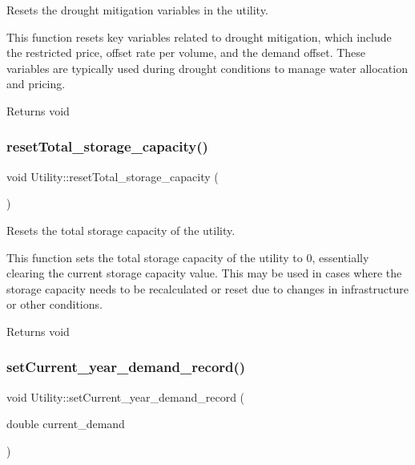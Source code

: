 Resets the drought mitigation variables in the utility. 

This function resets key variables related to drought mitigation, which include the restricted price, offset rate per volume, and the demand offset. These variables are typically used during drought conditions to manage water allocation and pricing.

\begin{DoxyReturn}{Returns}
void 
\end{DoxyReturn}
\mbox{\label{classUtility_a0ac180e13fb963a29c2860664c3f352a}} 
\subsubsection{\texorpdfstring{reset\+Total\+\_\+storage\+\_\+capacity()}{resetTotal\_storage\_capacity()}}
{\footnotesize\ttfamily void Utility\+::reset\+Total\+\_\+storage\+\_\+capacity (\begin{DoxyParamCaption}{ }\end{DoxyParamCaption})}



Resets the total storage capacity of the utility. 

This function sets the total storage capacity of the utility to 0, essentially clearing the current storage capacity value. This may be used in cases where the storage capacity needs to be recalculated or reset due to changes in infrastructure or other conditions.

\begin{DoxyReturn}{Returns}
void 
\end{DoxyReturn}
\mbox{\label{classUtility_a0a3190b991d667caf30a2e7cf447fae1}} 
\subsubsection{\texorpdfstring{set\+Current\+\_\+year\+\_\+demand\+\_\+record()}{setCurrent\_year\_demand\_record()}}
{\footnotesize\ttfamily void Utility\+::set\+Current\+\_\+year\+\_\+demand\+\_\+record (\begin{DoxyParamCaption}\item[{double}]{current\+\_\+demand }\end{DoxyParamCaption})}



